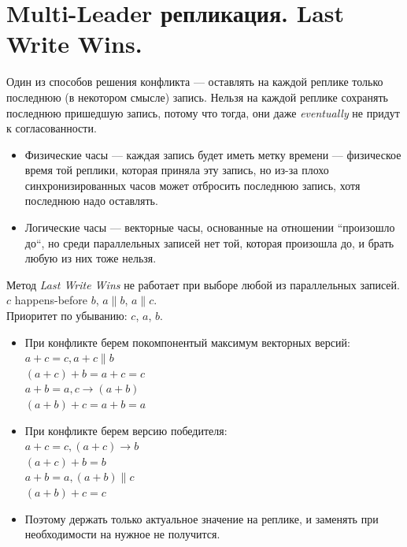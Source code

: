 \section{Multi-Leader репликация. Last Write Wins.}
    Один из способов решения конфликта --- оставлять на каждой реплике только последнюю (в некотором смысле) запись. Нельзя на каждой реплике сохранять последнюю пришедшую запись, потому что тогда, они даже \textit{eventually} не придут к согласованности.
    \begin{itemize}
        \item Физические часы --- каждая запись будет иметь метку времени --- физическое время той реплики, которая приняла эту запись, но из-за плохо синхронизированных часов может отбросить последнюю запись, хотя последнюю надо оставлять.
        \item Логические часы --- векторные часы, основанные на отношении ``произошло до``, но среди параллельных записей нет той, которая произошла до, и брать любую из них тоже нельзя.
    \end{itemize}
      \begin{definition}
        Метод \textit{Last Write Wins} не работает при выборе любой из параллельных записей.\\
          $c$ happens-before $b$, $a \parallel b$, $a \parallel c$. \\
          Приоритет по убыванию: $c$, $a$, $b$. \\
          \begin{itemize}
          \item При конфликте берем покомпонентый максимум векторных версий:\\
            $a + c = c, a + c \parallel b$\\
            $(a + c) + b = a + c = c$\\
            $a + b = a, c \rightarrow (a + b)$\\
            $(a + b) + c = a + b = a$\\
          \item При конфликте берем версию победителя:\\
            $a + c = c, (a + c) \rightarrow b$\\
            $(a + c) + b = b$\\
            $a + b = a, (a + b) \parallel c$\\
            $(a + b) + c = c$
         \item Поэтому держать только актуальное значение на реплике, и заменять при необходимости на нужное не получится.
        \end{itemize}
      \end{definition}
